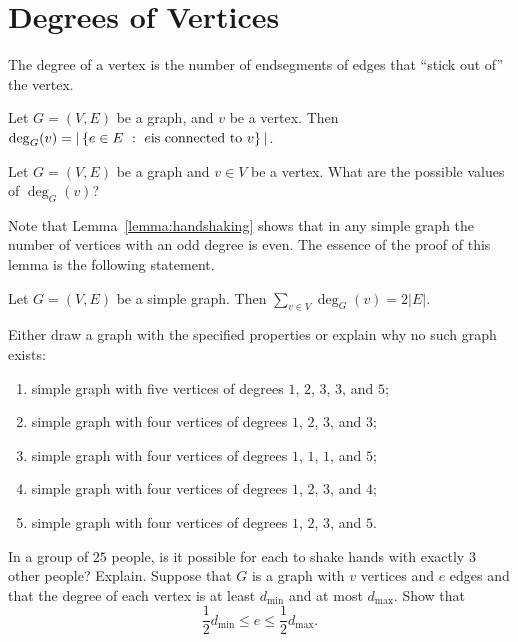 \section{Degrees of Vertices}
The degree of a vertex is the number of endsegments of edges that ``stick out
of'' the vertex.
\begin{definition}
  Let $G = (V, E)$ be a graph, and $v$ be a vertex. Then
  $\deg_G(v) = |\set[{e \text{is connected to } v}]{e \in E}|$.
\end{definition}

\begin{exercise}
  Let $G = (V, E)$ be a graph and $v \in V$ be a vertex.
  What are the possible values of $\deg_G(v)$?
\end{exercise}

Note that Lemma~\ref{lemma:handshaking} shows that in any simple graph the
number of vertices with an odd degree is even.
The essence of the proof of this lemma is the following statement.
\begin{theorem}
  Let $G = (V, E)$ be a simple graph. Then $\sum_{v \in V} \deg_G(v) = 2|E|$.
\end{theorem}

\begin{chapterendexercises}
  \exercise Either draw a graph with the specified properties or explain why
    no such graph exists:
    \begin{enumerate}[nolistsep]
      \item simple graph with five vertices of degrees $1$, $2$, $3$, $3$,
        and $5$;
      \item simple graph with four vertices of degrees $1$, $2$, $3$, and $3$;
      \item simple graph with four vertices of degrees $1$, $1$, $1$, and $5$;
      \item simple graph with four vertices of degrees $1$, $2$, $3$, and $4$;
      \item simple graph with four vertices of degrees $1$, $2$, $3$, and $5$.
    \end{enumerate}
  \exercise In a group of $25$ people, is it possible for each to shake hands
    with exactly $3$ other people? Explain.
  \exercise Suppose that $G$ is a graph with $v$ vertices and $e$ edges and
    that the degree of each vertex is at least $d_\mathrm{min}$ and at most
    $d_\mathrm{max}$. Show that
    \[
      \frac{1}{2} d_\mathrm{min} \le e \le \frac{1}{2} d_\mathrm{max}.
    \]
\end{chapterendexercises}
